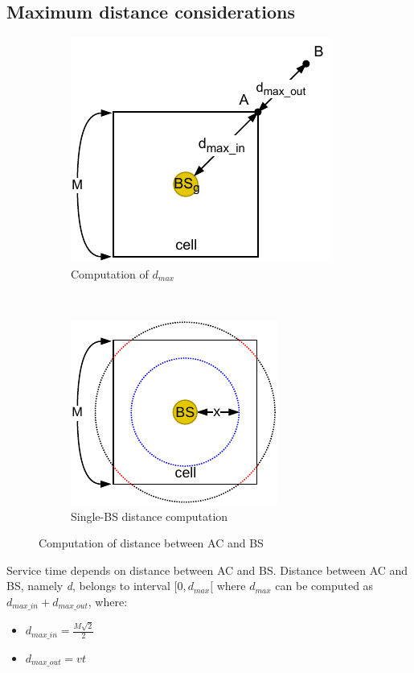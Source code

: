 \documentclass[a4paper,12pt]{article}
\begin{document}
\subsection{Maximum distance considerations}
\label{sec:max-distance-considerations}
\begin{figure}[H]
  \centering
  \begin{subfigure}[b]{0.45\textwidth}
    \centering
    \includegraphics{img/dmax.pdf}
    \caption{Computation of $d_{max}$}
    \label{fig:dmax}
  \end{subfigure}
  ~
  \begin{subfigure}[b]{0.45\textwidth}
    \centering
    \includegraphics{img/d-simplified.pdf}
    \caption{Single-BS distance computation}
    \label{fig:d-simplified}
  \end{subfigure}
  \caption{Computation of distance between AC and BS}
  \label{fig:d}
\end{figure}

Service time depends on distance between AC and BS.
Distance between AC and BS, namely \emph{d}, belongs to interval $[ 0, d_{max} [$ where $d_{max}$ can be computed as $d_{max\_in} + d_{max\_out}$, where:
\begin{itemize}
  \item $d_{max\_in} = \frac{M \sqrt{2}}{2} $
  \item $d_{max\_out} = vt$
\end{itemize}
\end{document}
